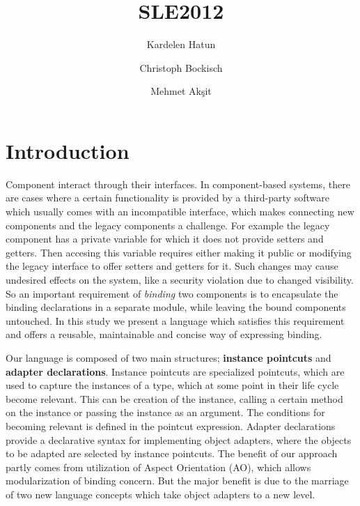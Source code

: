 \documentclass{llncs}
\begin{document}
\title{SLE2012}

\author{Kardelen Hatun \and Christoph Bockisch \and Mehmet Ak\c{s}it}

\maketitle
\section{Introduction}

Component interact through their interfaces. In component-based systems, there are cases where a certain functionality is provided by a third-party software which usually comes with an incompatible interface, which makes connecting new components and the legacy components a challenge. For example the legacy component has a private variable for which it does not provide setters and getters. Then accesing this variable requires either making it public or modifying the legacy interface to offer setters and getters for it. Such changes may cause undesired effects on the system, like a security violation due to changed visibility. So an important requirement of \emph{binding} two components is to encapsulate the binding declarations in a separate module, while leaving the bound components untouched. In this study we present a language which satisfies this requirement and offers a reusable, maintainable and concise way of expressing binding.

Our language is composed of two main structures; \textbf{instance pointcuts} and \textbf{adapter declarations}. Instance pointcuts are specialized pointcuts, which are used to capture the instances of a type, which at some point in their life cycle become relevant. This can be creation of the instance, calling a certain method on the instance or passing the instance as an argument. The conditions for becoming relevant is defined in the pointcut expression. Adapter declarations provide a declarative syntax for implementing object adapters, where the objects to be adapted are selected by instance pointcuts. The benefit of our approach partly comes from utilization of Aspect Orientation (AO), which allows modularization of binding concern. But the major benefit is due to the marriage of two new language concepts which take object adapters to a new level. 
\end{document}
